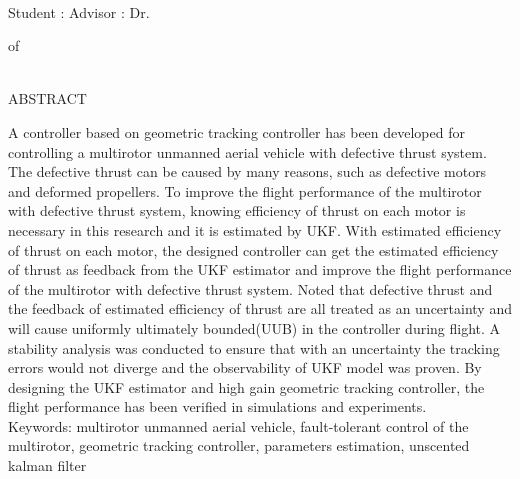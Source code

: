 \newpage
\begin{center}
    \begin{singlespace}
   	  \large \titleEn \\[0.8cm]
    \end{singlespace}

    Student : \studentEn  
    \hfill
    Advisor : Dr. \advisorEn \\[0.5cm]

   \begin{singlespace}
   \large \instituteEn{} of\\ \universityEn \\[0.5cm]
   \end{singlespace}
    
   \LARGE ABSTRACT \\[0.5cm]	
\end{center}

\normalsize 
A controller based on geometric tracking controller has been developed for controlling a multirotor unmanned aerial vehicle with defective thrust system. The defective thrust can be caused by many reasons, such as defective motors and deformed propellers. To improve the flight performance of the multirotor with defective thrust system, knowing efficiency of thrust on each motor is necessary in this research and it is estimated by UKF. With estimated efficiency of thrust on each motor, the designed controller can get the estimated efficiency of thrust as feedback from the UKF estimator and improve the flight performance of the multirotor with defective thrust system. Noted that defective thrust and the feedback of estimated efficiency of thrust are all treated as an uncertainty and will cause uniformly ultimately bounded(UUB) in the controller during flight. A stability analysis was conducted to ensure that with an uncertainty the tracking errors would not diverge and the observability of UKF model was proven. By designing the UKF estimator and high gain geometric tracking controller, the flight performance has been verified in simulations and experiments. \\[0.7cm]

Keywords: multirotor unmanned aerial vehicle, fault-tolerant control of the multirotor, geometric tracking controller, parameters estimation, unscented kalman filter